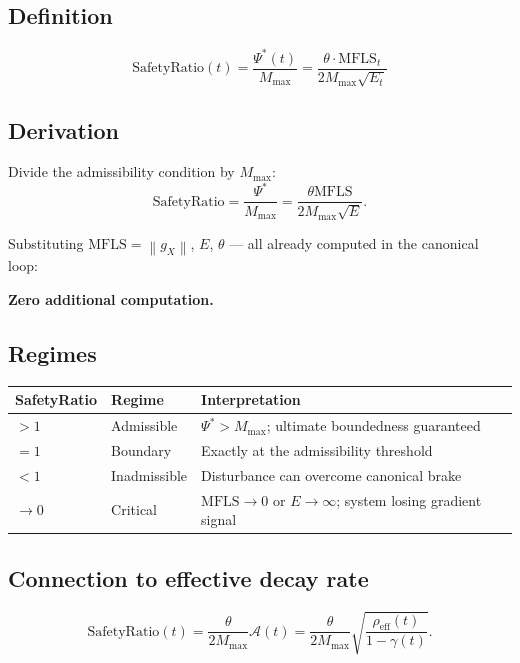 \documentclass[11pt,a4paper]{article}
\theoremstyle{definition}
\newcommand{\norm}[1]{\left\|#1\right\|}
\newcommand{\gX}{g_X}
\newcommand{\mfls}{\mathrm{MFLS}}
\begin{document}
\subsection{Definition}

\begin{lockedbox}
\[
\mathrm{SafetyRatio}(t) = \frac{\Psi^*(t)}{M_\mathrm{max}} = \frac{\theta\cdot\mfls_t}{2M_\mathrm{max}\sqrt{E_t}}
\]
\end{lockedbox}

\subsection{Derivation}

Divide the admissibility condition by $M_\mathrm{max}$:
\[
\mathrm{SafetyRatio} = \frac{\Psi^*}{M_\mathrm{max}} = \frac{\theta\mfls}{2M_\mathrm{max}\sqrt{E}}.
\]

Substituting $\mfls = \norm{\gX}$, $E$, $\theta$ — all already computed in the canonical loop:

\textbf{Zero additional computation.}

\subsection{Regimes}

\begin{center}
\begin{tabular}{lll}
\toprule
SafetyRatio & Regime & Interpretation \\
\midrule
$> 1$ & Admissible & $\Psi^* > M_\mathrm{max}$; ultimate boundedness guaranteed \\
$= 1$ & Boundary & Exactly at the admissibility threshold \\
$< 1$ & Inadmissible & Disturbance can overcome canonical brake \\
$\to 0$ & Critical & $\mfls \to 0$ or $E \to \infty$; system losing gradient signal \\
\bottomrule
\end{tabular}
\end{center}

\subsection{Connection to effective decay rate}

\[
\mathrm{SafetyRatio}(t) = \frac{\theta}{2M_\mathrm{max}}\mathcal{A}(t) = \frac{\theta}{2M_\mathrm{max}}\sqrt{\frac{\rho_\mathrm{eff}(t)}{1-\gamma(t)}}.
\]
\end{document}
